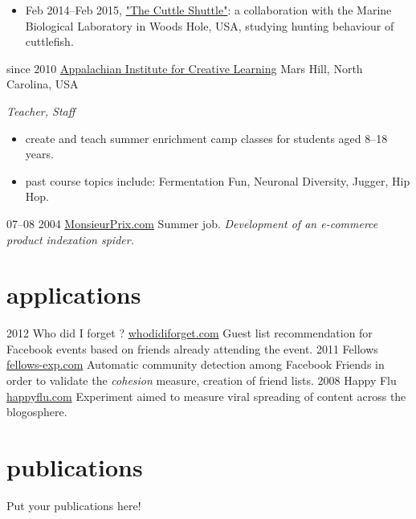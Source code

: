 \documentclass[]{friggeri-cv}
\begin{document}
\begin{entrylist}
{\begin{itemize}
    	\item Feb 2014--Feb 2015, \href{http://www.danbeekim.org/open-lab-notebook/cuttlefish-hunting-behavior/}{"The Cuttle Shuttle"}: a collaboration with the Marine Biological Laboratory in Woods Hole, USA, studying hunting behaviour of cuttlefish.
    \end{itemize}
	}
  \entry
    {since 2010}
    {\href{http://www.appalachianinstitute.org/}{Appalachian Institute for Creative Learning}}
    {Mars Hill, North Carolina, USA}
    {\emph{Teacher, Staff}
    \begin{itemize}
    	\item create and teach summer enrichment camp classes for students aged 8--18 years.
    	\item past course topics include: Fermentation Fun, Neuronal Diversity, Jugger, Hip Hop.
    \end{itemize}
	}
  \entry
    {07–08 2004}
    {\href{http://www.monsieurprix.com}{MonsieurPrix.com}}
    {Summer job.}
    {\emph{Development of an e-commerce product indexation spider.}}
\end{entrylist}

\section{applications}

\begin{entrylist}
  \entry
    {2012}
    {Who did I forget ?}
    {\href{http://whodidiforget.com}{whodidiforget.com}}
    {Guest list recommendation for Facebook events based on friends already attending the event.}
  \entry
    {2011}
    {Fellows}
    {\href{http://fellows-exp.com}{fellows-exp.com}}
    {Automatic community detection among Facebook Friends in order to validate the \emph{cohesion} measure, creation of friend lists.}
  \entry
    {2008}
    {Happy Flu}
    {\href{http://happyflu.com}{happyflu.com}}
    {Experiment aimed to measure viral spreading of content across the blogosphere.}
\end{entrylist}

\section{publications}

Put your publications here!

% 
\end{document}
